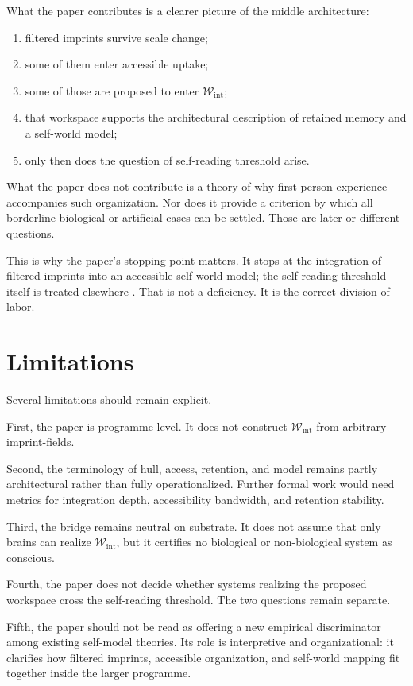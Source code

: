 \documentclass[12pt,a4paper]{article}
\begin{document}
What the paper contributes is a clearer picture of the middle architecture:

\begin{enumerate}
\item filtered imprints survive scale change;
\item some of them enter accessible uptake;
\item some of those are proposed to enter \(\mathcal W_{\mathrm{int}}\);
\item that workspace supports the architectural description of retained
memory and a self-world model;
\item only then does the question of self-reading threshold arise.
\end{enumerate}

What the paper does not contribute is a theory of why first-person experience accompanies such organization. Nor does it provide a criterion by which all borderline biological or artificial cases can be settled. Those are later or different questions.

This is why the paper's stopping point matters. It stops at the integration of filtered imprints into an accessible self-world model; the self-reading threshold itself is treated elsewhere \cite{WorldImprint}. That is not a deficiency. It is the correct division of labor.

\section{Limitations}

Several limitations should remain explicit.

First, the paper is programme-level. It does not construct
\(\mathcal W_{\mathrm{int}}\) from arbitrary imprint-fields.

Second, the terminology of hull, access, retention, and model remains partly architectural rather than fully operationalized. Further formal work would need metrics for integration depth, accessibility bandwidth, and retention stability.

Third, the bridge remains neutral on substrate. It does not assume that
only brains can realize \(\mathcal W_{\mathrm{int}}\), but it certifies
no biological or non-biological system as conscious.

Fourth, the paper does not decide whether systems realizing the proposed
workspace cross the self-reading threshold. The two questions remain
separate.

Fifth, the paper should not be read as offering a new empirical discriminator among existing self-model theories. Its role is interpretive and organizational: it clarifies how filtered imprints, accessible organization, and self-world mapping fit together inside the larger programme.
\end{document}
